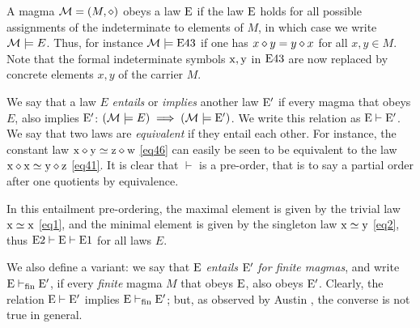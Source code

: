 A magma ${\mathcal{M}} = (M,\diamond)$ obeys a law $\mathrm{E}$ if the law $\mathrm{E}$ holds for all possible assignments of the indeterminate to elements of $M$, in which case we write ${\mathcal{M}} \models E$. Thus, for instance ${\mathcal{M}} \models \mathrm{E}43$ if one has $x \diamond y = y \diamond x$ for all $x,y \in M$.  Note that the formal indeterminate symbols $\mathrm{x}, \mathrm{y}$ in $\mathrm{E}43$ are now replaced by concrete elements $x,y$ of the carrier $M$.

We say that a law $E$ \emph{entails} or \emph{implies} another law ${\mathrm{E}'}$ if every magma that obeys $E$, also implies ${\mathrm{E}'}$: $({\mathcal{M}} \models E) \implies ({\mathcal{M}} \models {\mathrm{E}'})$.  We write this relation as ${\mathrm{E}} \vdash {\mathrm{E}'}$. We say that two laws are \emph{equivalent} if they entail each other. For instance, the constant law $\mathrm{x} \diamond \mathrm{y} \simeq \mathrm{z} \diamond \mathrm{w}$ \eqref{eq46} can easily be seen to be equivalent to the law $\mathrm{x} \diamond \mathrm{x} \simeq \mathrm{y} \diamond \mathrm{z}$ \eqref{eq41}.  It is clear that $\vdash$ is a pre-order, that is to say a partial order after one quotients by equivalence.

In this entailment pre-ordering, the maximal element is given by the trivial law $\mathrm{x}\simeq\mathrm{x}$ \eqref{eq1}, and the minimal element is given by the singleton law $\mathrm{x}\simeq \mathrm{y}$ \eqref{eq2}, thus $\mathrm{E}2 \vdash {\mathrm{E}} \vdash \mathrm{E}1$ for all laws $E$.

We also define a variant: we say that $\mathrm{E}$ \emph{entails} ${\mathrm{E}'}$ \emph{for finite magmas}, and write ${\mathrm{E}} \vdash_{\mathrm{fin}} {\mathrm{E}'}$, if every \emph{finite} magma $M$ that obeys $\mathrm{E}$, also obeys ${\mathrm{E}'}$.  Clearly, the relation ${\mathrm{E}} \vdash {\mathrm{E}'}$ implies ${\mathrm{E}} \vdash_{\mathrm{fin}} {\mathrm{E}'}$; but, as observed by Austin \cite{austin_finite}, the converse is not true in general.

